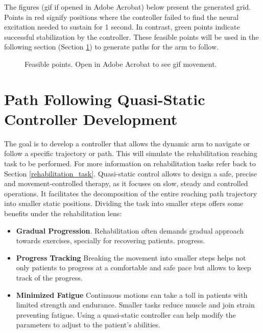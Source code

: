 The figures (gif if opened in Adobe Acrobat) below present the generated grid. Points in red signify positions where the controller failed to find the neural excitation needed to sustain for 1 second. In contrast, green points indicate successful stabilization by the controller. These feasible points will be used in the following section (Section \ref{sec:path}) to generate paths for the arm to follow. 


\begin{figure}[ht]
    \centering
    \caption{Feasible points. Open in Adobe Acrobat to see gif movement.}
    \label{gif:Feasiblepoints}
\end{figure}

\newpage
\section{Path Following Quasi-Static Controller Development } \label{sec:path}

The goal is to develop a controller that allows the dynamic arm  to navigate or follow a specific trajectory or path. This will simulate the rehabilitation reaching task to be performed. For more information on rehabilitation tasks refer back to Section \ref{rehabilitation_task}. Quasi-static control allows to design a safe, precise and movement-controlled therapy, as it focuses on slow, steady and controlled operations. It facilitates the decomposition of the entire reaching path trajectory into smaller static positions. Dividing the task into smaller steps offers some benefits under the rehabilitation lens:
\begin{itemize}
    \item \textbf{Gradual Progression}. Rehabilitation often demands gradual approach towards exercises, specially for recovering patients. progress.
    \item \textbf{Progress Tracking} Breaking the movement into smaller steps helps not only patients to progress at a comfortable and safe pace but allows to keep track of the progress.
    \item \textbf{Minimized Fatigue} Continuous motions can take a toll in patients with limited strength and endurance. Smaller tasks reduce muscle and join strain preventing fatigue. Using a quasi-static controller can help modify the parameters to adjust to the patient's abilities. 
\end{itemize}

